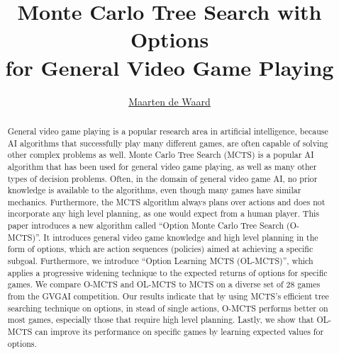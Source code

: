 \documentclass[a4]{report}
\title{Monte Carlo Tree Search with Options\\for General Video Game Playing}
\author{\href{mailto:mrtndwrd@gmail.com}{Maarten de Waard}}
\begin{document}

\maketitle

\begin{abstract}
	General video game playing is a popular research area in artificial
	intelligence, because AI algorithms that successfully play many different
	games, are often capable of solving other complex problems as well.  Monte
	Carlo Tree Search (MCTS) is a popular AI algorithm that has been used for
	general video game playing, as well as many other types of decision
	problems. Often, in the domain of general video game AI, no prior knowledge
	is available to the algorithms, even though many games have similar
	mechanics. Furthermore, the MCTS algorithm always plans over actions and
	does not incorporate any high level planning, as one would expect from a
	human player. This paper introduces a new algorithm called ``Option Monte
	Carlo Tree Search (O-MCTS)''. It introduces general video game knowledge and
	high level planning in the form of options, which are action sequences
	(policies) aimed at achieving a specific subgoal. Furthermore, we introduce
	``Option Learning MCTS (OL-MCTS)'', which applies a progressive widening
	technique to the expected returns of options for specific games.  We compare
	O-MCTS and OL-MCTS to MCTS on a diverse set of 28 games from the GVGAI
	competition. Our results indicate that by using MCTS's efficient tree
	searching technique on options, in stead of single actions, O-MCTS performs
	better on most games, especially those that require high level planning.
	Lastly, we show that OL-MCTS can improve its performance on specific games
	by learning expected values for options.
\end{abstract}

\tableofcontents




















\end{document}
